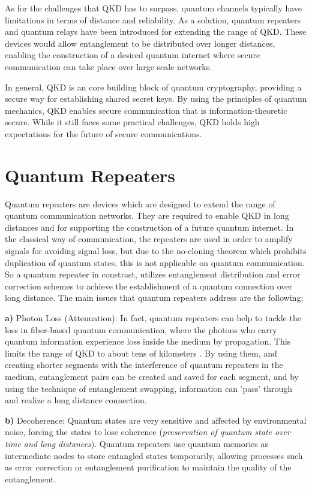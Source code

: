 \documentclass[12pt,a4paper] {report}
\begin{document}
		As for the challenges that QKD has to surpass, quantum channels typically have limitations in terms of distance and reliability.
		As a solution, quantum repeaters and quantum relays have been introduced for extending the range of QKD. 
		These devices would allow entanglement to be distributed over longer distances, 
		enabling the construction of a desired quantum internet where secure communication can take place over large scale networks.

		In general, QKD is an core building block of quantum cryptography,
		providing a secure way for establishing shared secret keys. 
		By using the principles of quantum mechanics, QKD enables secure communication that is 
		information-theoretic secure. While it still faces some practical challenges, QKD holds high expectations for the 
		future of secure communications.

		\section{Quantum Repeaters}
		
		Quantum repeaters are devices which are designed to extend the range of quantum communication networks. They 
		are required to enable QKD in long distances and for supporting the construction of a future quantum internet.
		In the classical way of communication, the repeaters are used in order to amplify signals 
		for avoiding signal loss, but due to the no-cloning theorem which prohibits duplication of quantum states,
		this is not applicable on quantum communication. So a quantum repeater in constrast, utilizes entanglement distribution 
		and error correction schemes to achieve the establishment of a quantum connection over long distance.
		The main issues that quantum repeaters address are the following:

		\textbf{a)} Photon Loss (Attenuation):
		In fact, quantum repeaters can help to tackle the loss in fiber-based quantum communication,
		where the photons who carry quantum information experience loss inside the medium by propagation. 
		This limits the range of QKD to about tens of kilometers \cite{repeater1}. 
		By using them, and creating shorter segments with the interference of quantum repeaters in the medium,
		entanglement pairs can be created and saved for each segment, 
		and by using the technique of entanglement swapping, information can 'pass' through and realize a long distance connection.

		\textbf{b)} Decoherence:
		Quantum states are very sensitive and affected by environmental noise, forcing the states to lose coherence (\textit{preservation of quantum
		state over time and long distances}).
		Quantum repeaters use quantum memories\cite{memories} as intermediate nodes to store entangled states 
		temporarily, allowing processes such as error correction or entanglement purification to maintain 
		the quality of the entanglement.
		
\end{document}
